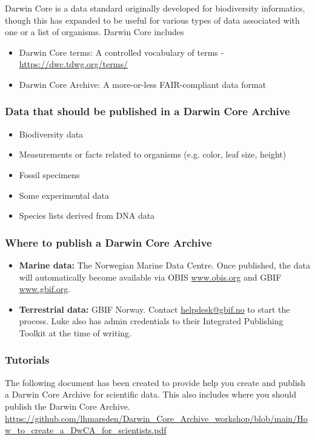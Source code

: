 \documentclass[a4paper,12pt]{article}
\begin{document}
Darwin Core is a data standard originally developed for biodiversity informatics, though this has expanded to be useful for various types of data associated with one or a list of organisms. Darwin Core includes
\begin{itemize}
\item Darwin Core terms: A controlled vocabulary of terms - \url{https://dwc.tdwg.org/terms/}
\item Darwin Core Archive: A more-or-less FAIR-compliant data format
\end{itemize}

\subsubsection{Data that should be published in a Darwin Core Archive}
\begin{itemize}
\item{Biodiversity data}
\item{Measurements or facts related to organisms (e.g. color, leaf size, height)}
\item{Fossil specimens}
\item{Some experimental data}
\item{Species lists derived from DNA data}
\end{itemize}

\subsubsection{Where to publish a Darwin Core Archive}

\begin{itemize}
\item \textbf{Marine data: } The Norwegian Marine Data Centre. Once published, the data will automatically become available via OBIS \url{www.obis.org} and GBIF \url{www.gbif.org}.
\item \textbf{Terrestrial data: } GBIF Norway. Contact \href{mailto:helpdesk@gbif.no}{helpdesk@gbif.no} to start the process. Luke also has admin credentials to their Integrated Publishing Toolkit at the time of writing. 
\end{itemize}

\subsubsection{Tutorials}
 
The following document has been created to provide help you create and publish a Darwin Core Archive for scientific data. This also includes where you should publish the Darwin Core Archive.
\url{https://github.com/lhmarsden/Darwin_Core_Archive_workshop/blob/main/How_to_create_a_DwCA_for_scientists.pdf}
\end{document}
